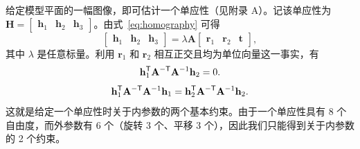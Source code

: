 给定模型平面的一幅图像，即可估计一个单应性（见附录 A）。记该单应性为
$\mathbf H=\begin{bmatrix}\mathbf h_1&\mathbf h_2&\mathbf h_3\end{bmatrix}$。由式~\eqref{eq:homography} 可得
\begin{equation*}
    \begin{bmatrix}\mathbf h_1&\mathbf h_2&\mathbf h_3\end{bmatrix}
    =\lambda\mathbf A
    \begin{bmatrix}\mathbf r_1&\mathbf r_2&\mathbf t\end{bmatrix},
\end{equation*}
其中 $\lambda$ 是任意标量。利用 $\mathbf r_1$ 和 $\mathbf r_2$ 相互正交且均为单位向量这一事实，有
\begin{equation}
    \mathbf h_1^{\mathsf{T}}\mathbf A^{-\mathsf{T}}\mathbf A^{-1}\mathbf h_2=0.
    \label{eq:orthogonality}
\end{equation}
\begin{equation}
    \mathbf h_1^{\mathsf{T}}\mathbf A^{-\mathsf{T}}\mathbf A^{-1}\mathbf h_1
    =\mathbf h_2^{\mathsf{T}}\mathbf A^{-\mathsf{T}}\mathbf A^{-1}\mathbf h_2.
    \label{eq:equal-norm}
\end{equation}
这就是给定一个单应性时关于内参数的两个基本约束。由于一个单应性具有 8 个自由度，而外参数有 6 个（旋转 3 个、平移 3 个），因此我们只能得到关于内参数的 2 个约束。
